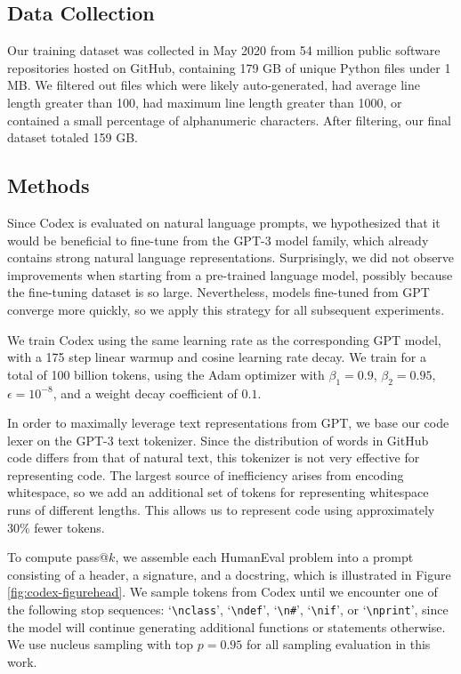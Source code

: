 \subsection{Data Collection}
\label{sec:ft:data}

Our training dataset was collected in May 2020 from 54 million public software repositories hosted on GitHub, containing 179 GB of unique Python files under 1 MB. We filtered out files which were likely auto-generated, had average line length greater than 100, had maximum line length greater than 1000, or contained a small percentage of alphanumeric characters. After filtering, our final dataset totaled 159 GB.

\subsection{Methods}
\label{sec:ft:methods}

Since Codex is evaluated on natural language prompts, we hypothesized that it would be beneficial to fine-tune from the GPT-3 \citep{brown2020gpt3} model family, which already contains strong natural language representations. Surprisingly, we did not observe improvements when starting from a pre-trained language model, possibly because the fine-tuning dataset is so large. Nevertheless, models fine-tuned from GPT converge more quickly, so we apply this strategy for all subsequent experiments.

We train Codex using the same learning rate as the corresponding GPT model, with a 175 step linear warmup and cosine learning rate decay. We train for a total of 100 billion tokens, using the Adam optimizer with $\beta_1 = 0.9$, $\beta_2 = 0.95$, $\epsilon = 10^{-8}$, and a weight decay coefficient of $0.1$.

In order to maximally leverage text representations from GPT, we base our code lexer on the GPT-3 text tokenizer. Since the distribution of words in GitHub code differs from that of natural text, this tokenizer is not very effective for representing code. The largest source of inefficiency arises from encoding whitespace, so we add an additional set of tokens for representing whitespace runs of different lengths. This allows us to represent code using approximately 30\% fewer tokens.

To compute pass@$k$, we assemble each HumanEval problem into a prompt consisting of a header, a signature, and a docstring, which is illustrated in Figure \ref{fig:codex-figurehead}. We sample tokens from Codex until we encounter one of the following stop sequences: `\texttt{\textbackslash nclass}', `\texttt{\textbackslash ndef}', `\texttt{\textbackslash n\#}', `\texttt{\textbackslash nif}', or `\texttt{\textbackslash nprint}', since the model will continue generating additional functions or statements otherwise. We use nucleus sampling \citep{holtzman2020curious} with top $p=0.95$ for all sampling evaluation in this work.

